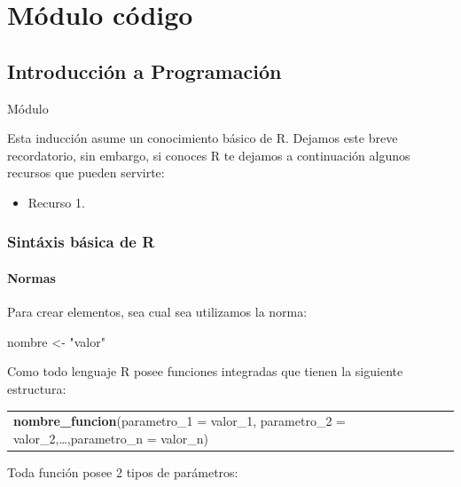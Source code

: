 \documentclass[
  letterpaper,
  DIV=11,
  numbers=noendperiod]{scrreprt}
\newenvironment{Shaded}{\begin{snugshade}}{\end{snugshade}}
\newcommand{\NormalTok}[1]{\textcolor[rgb]{0.00,0.23,0.31}{#1}}
\newcommand{\OtherTok}[1]{\textcolor[rgb]{0.00,0.23,0.31}{#1}}
\newcommand{\StringTok}[1]{\textcolor[rgb]{0.13,0.47,0.30}{#1}}
\providecommand{\tightlist}{%
  \setlength{\itemsep}{0pt}\setlength{\parskip}{0pt}}
\begin{document}
\part{Módulo código}

\chapter{Introducción a
Programación}\label{introducciuxf3n-a-programaciuxf3n}

Módulo

\hfill\break

Esta inducción asume un conocimiento básico de R. Dejamos este breve
recordatorio, sin embargo, si conoces R te dejamos a continuación
algunos recursos que pueden servirte:

\begin{itemize}
\tightlist
\item
  Recurso 1.
\end{itemize}

\section{Sintáxis básica de R}\label{sintuxe1xis-buxe1sica-de-r}

\subsection{Normas}\label{normas}

Para crear elementos, sea cual sea utilizamos la norma:

\begin{Shaded}
\begin{Highlighting}[]
\NormalTok{nombre }\OtherTok{\textless{}{-}} \StringTok{"valor"}
\end{Highlighting}
\end{Shaded}

Como todo lenguaje R posee funciones integradas que tienen la siguiente
estructura:

\begin{longtable}[]{@{}
  >{\raggedright\arraybackslash}p{}@{}}
\toprule\noalign{}
\endhead
\bottomrule\noalign{}
\endlastfoot
\textbf{nombre\_funcion}(parametro\_1 = valor\_1, parametro\_2 =
valor\_2,\ldots,parametro\_n = valor\_n) \\
\end{longtable}

Toda función posee 2 tipos de parámetros:
\end{document}
